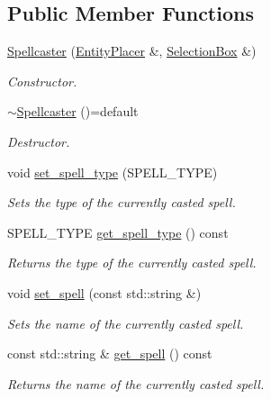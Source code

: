 \subsection*{Public Member Functions}
\begin{DoxyCompactItemize}
\item 
\hyperlink{class_spellcaster_a633d55dbde7a54a2142064ae68865a51}{Spellcaster} (\hyperlink{class_entity_placer}{Entity\+Placer} \&, \hyperlink{class_selection_box}{Selection\+Box} \&)
\begin{DoxyCompactList}\small\item\em Constructor. \end{DoxyCompactList}\item 
\hyperlink{class_spellcaster_ac4ec32a60b9e23f653f59fa0f1ee6716}{$\sim$\+Spellcaster} ()=default
\begin{DoxyCompactList}\small\item\em Destructor. \end{DoxyCompactList}\item 
void \hyperlink{class_spellcaster_ab0b5ede64fc2de3e6cfc2c27ac1c2524}{set\+\_\+spell\+\_\+type} (S\+P\+E\+L\+L\+\_\+\+T\+Y\+PE)
\begin{DoxyCompactList}\small\item\em Sets the type of the currently casted spell. \end{DoxyCompactList}\item 
S\+P\+E\+L\+L\+\_\+\+T\+Y\+PE \hyperlink{class_spellcaster_a988a60b96ba7ecfd99e8c462cc446224}{get\+\_\+spell\+\_\+type} () const 
\begin{DoxyCompactList}\small\item\em Returns the type of the currently casted spell. \end{DoxyCompactList}\item 
void \hyperlink{class_spellcaster_a4d4747d2b5d28699ff49f9e73ab674ef}{set\+\_\+spell} (const std\+::string \&)
\begin{DoxyCompactList}\small\item\em Sets the name of the currently casted spell. \end{DoxyCompactList}\item 
const std\+::string \& \hyperlink{class_spellcaster_a1ea142cee9e86569f1e0dfd6ae09a291}{get\+\_\+spell} () const 
\begin{DoxyCompactList}\small\item\em Returns the name of the currently casted spell. \end{DoxyCompactList}\item 

\end{DoxyCompactItemize}
